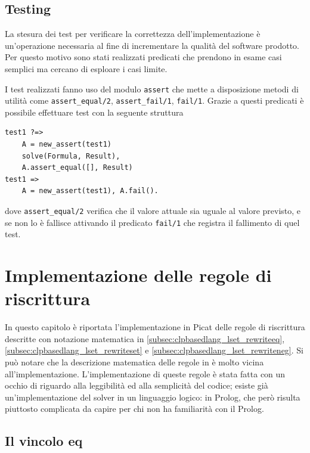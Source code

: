 \documentclass[12pt,a4paper,openright]{book} %
\begin{document}
\section{Testing}
\label{sec:lsetpicat_testing}

La stesura dei test per verificare la correttezza dell'implementazione
è un’operazione necessaria al fine di incrementare la qualità del
software prodotto. Per questo motivo sono stati realizzati predicati
che prendono in esame casi semplici ma cercano di esploare i casi
limite.

I test realizzati fanno uso del modulo \verb|assert| che mette a
disposizione metodi di utilità come \verb|assert_equal/2|,
\verb|assert_fail/1|, \verb|fail/1|. Grazie a questi predicati è
possibile effettuare test con la seguente struttura
\begin{verbatim}
test1 ?=>
    A = new_assert(test1)
    solve(Formula, Result),
    A.assert_equal([], Result)
test1 =>
    A = new_assert(test1), A.fail().
\end{verbatim}
dove \verb|assert_equal/2| verifica che il valore attuale sia uguale
al valore previsto, e se non lo è fallisce attivando il predicato
\verb|fail/1| che registra il fallimento di quel test.



\chapter{Implementazione delle regole di riscrittura}
\label{ch:impl}


In questo capitolo è riportata l'implementazione in Picat delle regole
di riscrittura descritte con notazione matematica in
\ref{subsec:clpbasedlang_lset_rewriteeq},
\ref{subsec:clpbasedlang_lset_rewriteset} e
\ref{subsec:clpbasedlang_lset_rewriteneg}. Si può notare che la
descrizione matematica delle regole in \cite{Rossi18} è molto vicina
all’implementazione. L'implementazione di queste regole è stata fatta
con un occhio di riguardo alla leggibilità ed alla semplicità del
codice; esiste già un'implementazione del solver in un linguaggio
logico: \setlog{} in Prolog, che però risulta piuttosto complicata da
capire per chi non ha familiarità con il Prolog.

\section{Il vincolo eq}
\end{document}
